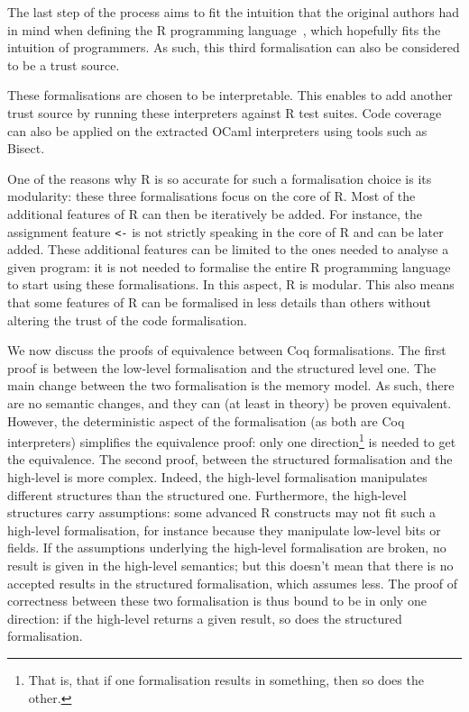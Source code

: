 \documentclass{article}
\newcommand\Coq{Coq}
\newcommand\OCaml{OCaml}
\newcommand\R{R}
\begin{document}
The last step of the process aims to fit
the intuition that the original authors had in mind when defining
the \R{} programming language~\parencite{ihaka1996r},
which hopefully fits the intuition of programmers.
As such, this third formalisation can also be considered to be a trust source.

These formalisations are chosen to be interpretable.
This enables to add another trust source
by running these interpreters against \R{} test suites.
Code coverage can also be applied on the extracted \OCaml{} interpreters
using tools such as Bisect.

One of the reasons why \R{} is so accurate for such a formalisation choice
is its modularity:
these three formalisations focus on the core of \R{}.
Most of the additional features of \R{} can then be iteratively be added.
For instance, the assignment feature \texttt{<-} is not
strictly speaking in the core of \R{} and can be later added.
These additional features can be limited to the ones needed to analyse
a given program:
it is not needed to formalise the entire \R{} programming language to start
using these formalisations.
In this aspect, \R{} is modular.
%
This also means that some features of \R{} can be formalised
in less details than others
without altering the trust of the code formalisation.

We now discuss the proofs of equivalence between \Coq{} formalisations.
%
The first proof is between the low-level formalisation
and the structured level one.
The main change between the two formalisation is the memory model.
As such, there are no semantic changes,
and they can (at least in theory)
be proven equivalent.
However, the deterministic aspect of the formalisation
(as both are \Coq{} interpreters)
simplifies the equivalence proof:
only one direction\footnote{
    That is, that if one formalisation results in something,
    then so does the other.
} is needed to get the equivalence.
%
The second proof, between the structured formalisation
and the high-level is more complex.
Indeed, the high-level formalisation manipulates
different structures than the structured one.
Furthermore, the high-level structures carry assumptions:
some advanced \R{} constructs may not fit such a high-level formalisation,
for instance because they manipulate low-level bits or fields.
If the assumptions underlying the high-level formalisation
are broken, no result is given in the high-level semantics;
but this doesn’t mean that there is no accepted results in the
structured formalisation, which assumes less.
The proof of correctness between these two formalisation
is thus bound to be in only one direction:
if the high-level returns a given result,
so does the structured formalisation.
\end{document}
